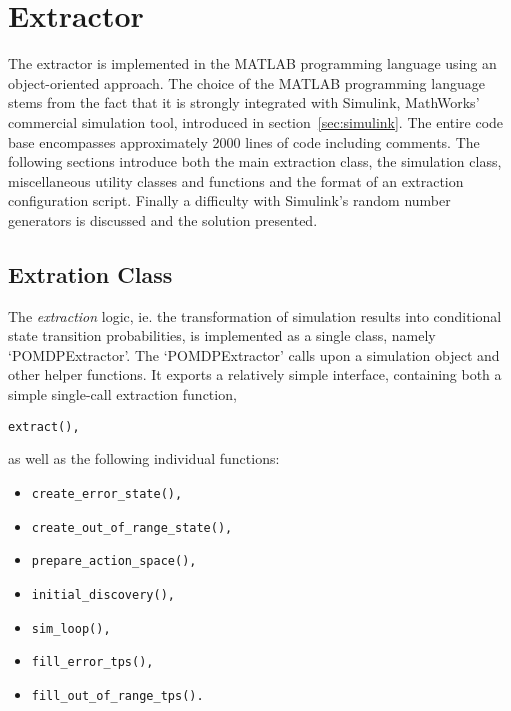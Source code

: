 \section{Extractor}

The extractor is implemented in the MATLAB programming language using an object-oriented approach. The choice of the MATLAB programming language stems from the fact that it is strongly integrated with Simulink, MathWorks' commercial simulation tool, introduced in section~\ref{sec:simulink}. The entire code base encompasses approximately 2000 lines of code including comments. The following sections introduce both the main extraction class, the simulation class, miscellaneous utility classes and functions and the format of an extraction configuration script. Finally a difficulty with Simulink's random number generators is discussed and the solution presented.

\subsection{Extration Class}

The \textit{extraction} logic, ie. the transformation of simulation results into conditional state transition probabilities, is implemented as a single class, namely `POMDPExtractor'. The `POMDPExtractor' calls upon a simulation object and other helper functions. It exports a relatively simple interface, containing both a simple single-call extraction function,
 \begin{verbatim}extract(),\end{verbatim}

 as well as the following individual functions:

\begin{itemize}
\item \begin{verbatim}create_error_state(),\end{verbatim}
\item \begin{verbatim}create_out_of_range_state(),\end{verbatim}
\item \begin{verbatim}prepare_action_space(),\end{verbatim}
\item \begin{verbatim}initial_discovery(),\end{verbatim}
\item \begin{verbatim}sim_loop(),\end{verbatim}
\item \begin{verbatim}fill_error_tps(),\end{verbatim}
\item \begin{verbatim}fill_out_of_range_tps().\end{verbatim}
\end{itemize}


